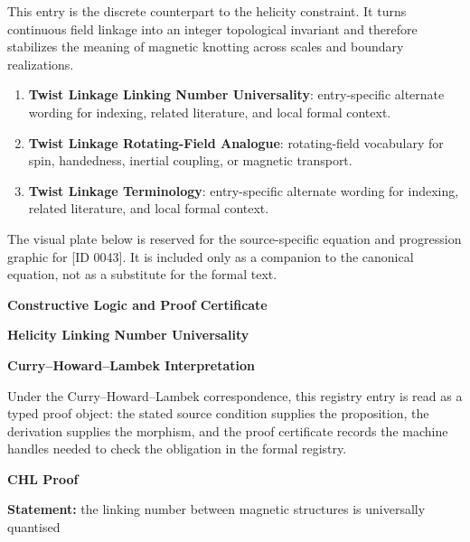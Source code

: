 This entry is the discrete counterpart to the helicity constraint. It turns continuous field linkage into an integer topological invariant and therefore stabilizes the meaning of magnetic knotting across scales and boundary realizations.
\endgroup

\begingroup\footnotesize\sloppy
\begin{enumerate}[leftmargin=1.35em,itemsep=1pt,topsep=1pt,parsep=0pt]
\item \textbf{Twist Linkage Linking Number Universality}: entry-specific alternate wording for indexing, related literature, and local formal context.
\item \textbf{Twist Linkage Rotating-Field Analogue}: rotating-field vocabulary for spin, handedness, inertial coupling, or magnetic transport.
\item \textbf{Twist Linkage Terminology}: entry-specific alternate wording for indexing, related literature, and local formal context.
\end{enumerate}
\endgroup

\begingroup\footnotesize\sloppy
The visual plate below is reserved for the source-specific equation and progression graphic for [ID 0043]. It is included only as a companion to the canonical equation, not as a substitute for the formal text.
\par\endgroup
\ifTZPDarkEdition
{}
\fi

\clearpage
\begingroup\tzpsupportsetup
\noindent\textbf{\fontsize{10.8pt}{12.8pt}\selectfont [ID 0043] Constructive Logic and Proof Certificate}\par
\noindent\textbf{\fontsize{10pt}{12pt}\selectfont Helicity Linking Number Universality}\par
\vspace{0.45em}
\begingroup
\footnotesize
\setlength{\parskip}{0.22em}
\setlength{\parindent}{0pt}
\noindent\textbf{Curry--Howard--Lambek Interpretation}\par
Under the Curry--Howard--Lambek correspondence, this registry entry is read as a typed proof
object: the stated source condition supplies the proposition, the derivation supplies the
morphism, and the proof certificate records the machine handles needed to check the obligation
in the formal registry.

\vspace{0.45em}
\noindent\textbf{CHL Proof}\par
\textbf{Statement:} the linking number between magnetic structures is universally quantised

